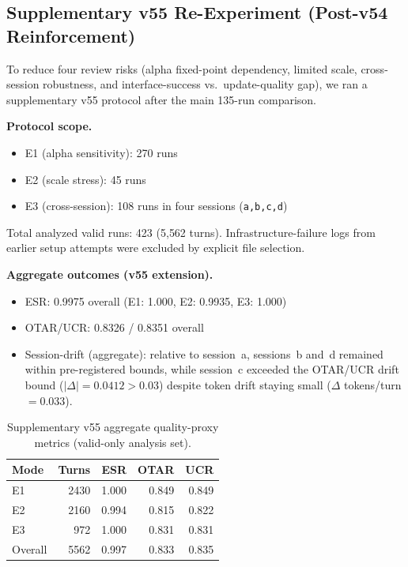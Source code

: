 \documentclass[11pt,a4paper]{article}
\begin{document}
\subsection{Supplementary v55 Re-Experiment (Post-v54 Reinforcement)}

To reduce four review risks (alpha fixed-point dependency, limited scale,
cross-session robustness, and interface-success vs.\ update-quality gap), we
ran a supplementary v55 protocol after the main 135-run comparison.

\textbf{Protocol scope.}
\begin{itemize}
    \item E1 (alpha sensitivity): 270 runs
    \item E2 (scale stress): 45 runs
    \item E3 (cross-session): 108 runs in four sessions (\texttt{a,b,c,d})
\end{itemize}
Total analyzed valid runs: 423 (5{,}562 turns). Infrastructure-failure logs
from earlier setup attempts were excluded by explicit file selection.

\textbf{Aggregate outcomes (v55 extension).}
\begin{itemize}
    \item ESR: 0.9975 overall (E1: 1.000, E2: 0.9935, E3: 1.000)
    \item OTAR/UCR: 0.8326 / 0.8351 overall
    \item Session-drift (aggregate): relative to session~a, sessions~b and~d
    remained within pre-registered bounds, while session~c exceeded the OTAR/UCR
    drift bound ($|\Delta|=0.0412 > 0.03$) despite token drift staying small
    ($\Delta$ tokens/turn $=0.033$).
\end{itemize}

\begin{table}[ht]
\centering
\begin{tabular}{lrrrr}
\toprule
\textbf{Mode} & \textbf{Turns} & \textbf{ESR} & \textbf{OTAR} & \textbf{UCR} \\
\midrule
E1 & 2430 & 1.000 & 0.849 & 0.849 \\
E2 & 2160 & 0.994 & 0.815 & 0.822 \\
E3 & 972 & 1.000 & 0.831 & 0.831 \\
\midrule
Overall & 5562 & 0.997 & 0.833 & 0.835 \\
\bottomrule
\end{tabular}
\caption{Supplementary v55 aggregate quality-proxy metrics (valid-only analysis set).}
\label{tab:v55_mode_metrics}
\end{table}
\end{document}
